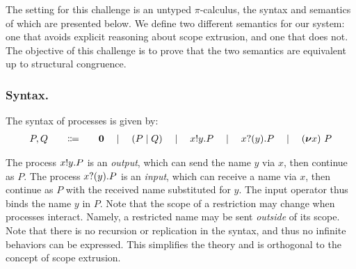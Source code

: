\documentclass[runningheads]{llncs}
\begin{document}
The setting for this challenge is an untyped \( \pi \)-calculus, the syntax and semantics of which are presented below.
We define two different semantics for our system: one that avoids explicit reasoning about scope extrusion, and one that does not.
The objective of this challenge is to prove that the two semantics are equivalent up to structural congruence.

\subsubsection{Syntax.}
The syntax of processes is given by:
\[
\begin{array}{r@{\qquad}c@{\qquad}l}
  P,Q & \Coloneqq & \Pend \quad\mid\quad \PBpar{P}{Q} \quad\mid\quad \Pout{x}{y}{P} \quad\mid\quad \Pin{x}{y}{P} \quad\mid\quad \Pres{x}{P}
\end{array}
\]


The process \( x ! y . P \) is an \emph{output}, which can send the name \( y \) via \( x \), then continue as \( P \).
The process \( x ? (y) . P \) is an \emph{input}, which can receive a name via \( x \), then continue as \( P \) with the received name substituted for \( y \).
The input operator thus binds the name \( y \) in \( P \).
Note that the scope of a restriction may change when processes interact. Namely, a restricted name may be sent \emph{outside} of its scope.
Note that there is no recursion or replication in the syntax, and thus no infinite behaviors can be expressed.
This simplifies the theory and is orthogonal to the concept of scope extrusion.

\end{document}
